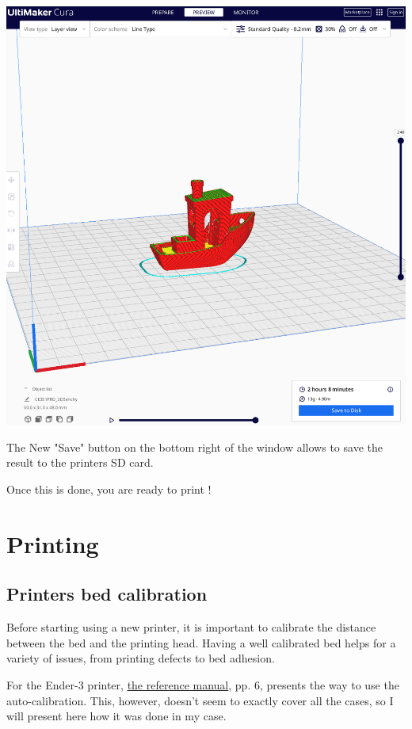 \documentclass[a4paper,11pt]{article}
\begin{document}
\begin{center}
\includegraphics[width=.9\linewidth]{img/cura/10.png}
\end{center}

The New "Save" button on the bottom right of the window allows to save the result to the printers
SD card.

Once this is done, you are ready to print !



\pagebreak
\section{Printing}
\label{sec:orge63f55d}

\subsection{Printers bed calibration}
\label{sec:org034d9ff}
Before starting using a new printer, it is important to calibrate the distance between the bed and the printing head.
Having a well calibrated bed helps for a variety of issues, from printing defects to bed adhesion.

For the Ender-3 printer, \href{https://img.staticdj.com/8f39f619af6bf34e5afb36ddbf2a0229.pdf?spm=..page\_1995605.download\_support\_1.1\&spm\_prev=..product\_5e45abfb-4541-4c92-ba93-cfba9a1e3ea4.nav\_link\_store\_1.1}{the reference manual}, pp. 6, presents the  way to use the auto-calibration.
This, however, doesn't seem to exactly cover all the cases, so I will present here how it was done in my case.
\end{document}
